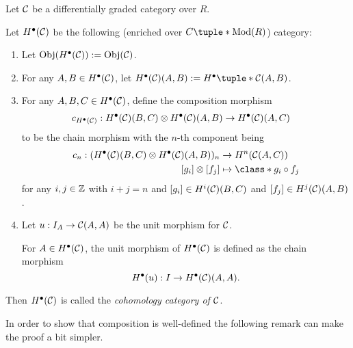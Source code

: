 \begin{definition}
    \label{def:H_bullet_dg_category}
    Let \( {\mathcal{C}} \) be a differentially graded category over  \( R \).

    Let \( H^\bullet({\mathcal{C}}) \) be the following (enriched over \( C\tuple*{\Mod(R)} \)) category:
    \begin{enumerate}
        \item Let \( \operatorname{Obj}(H^\bullet({\mathcal{C}})) := \operatorname{Obj}({\mathcal{C}}) \).
        \item For any \( A, B \in H^\bullet({\mathcal{C}}) \), let \( H^\bullet(\Cc)(A, B) := H^\bullet \tuple*{\Cc(A, B)} \).
        \item {
            For any \( A, B, C \in H^\bullet({\mathcal{C}}) \), define the composition morphism
            \begin{align*}
                c_{H^\bullet({\mathcal{C}})}: H^\bullet({\mathcal{C}})(B, C) \otimes H^\bullet({\mathcal{C}})(A, B) &\to H^\bullet({\mathcal{C}})(A, C)
            \end{align*}
            to be the chain morphism with the \( n \)-th component being
            \begin{align*}
                c_n: (H^\bullet(\Cc)(B, C) \otimes H^\bullet(\Cc)(A, B))_n &\to H^n(\Cc(A, C)) \\
                [g_i] \otimes [f_j] &\mapsto \class*{g_i \circ f_j}
            \end{align*}
            for any \( i, j \in {\mathbb{Z}} \) with \( i + j = n \) and \( [g_i] \in H^i({\mathcal{C}})(B, C) \) and \( [f_j] \in H^j({\mathcal{C}})(A, B) \).
        }
        \item {
            Let \( u: I_A \to {\mathcal{C}}(A, A) \) be the unit morphism for \( {\mathcal{C}} \).
            
            For \( A \in H^\bullet({\mathcal{C}}) \), the unit morphism of \( H^\bullet({\mathcal{C}}) \) is defined as the chain morphism
            \[
                H^\bullet(u): I \to H^\bullet({\mathcal{C}})(A, A).
            \]
        }
    \end{enumerate}

    Then \( H^\bullet({\mathcal{C}}) \) is called the \emph{cohomology category of \( {\mathcal{C}} \)}.
\end{definition}

In order to show that composition is well-defined the following remark can make the proof a bit simpler.

